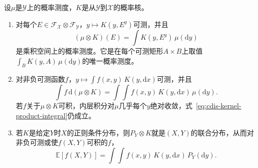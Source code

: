 \begin{theorem}[由核与边缘确定联合规律]
\label{thm:cdis-kernel-product}
设$\mu$是$\mathcal{Y}$上的概率测度，$K$是从$\mathcal{Y}$到$\mathcal{X}$的概率核。
\begin{enumerate}
 \item 对每个$E\in\mathcal{F}_{\mathcal{X}}\otimes\mathcal{F}_{\mathcal{Y}}$，$y\mapsto K(y,E^{y})$可测，并且
 \begin{equation}
  (\mu\otimes K)(E)=\int K(y,E^{y})\,\mu(\mathrm{d}y)
  \label{eq:cdis-kernel-product}
 \end{equation}
 是乘积空间上的概率测度。它是在每个可测矩形$A\times B$上取值$\int_{B}K(y,A)\,\mu(\mathrm{d}y)$的唯一概率测度。
 \item 对非负可测函数$f$，$y\mapsto\int f(x,y)\,K(y,\mathrm{d}x)$可测，并且
 \begin{equation}
  \int f\,\mathrm{d}(\mu\otimes K)=\int\!\!\int f(x,y)\,K(y,\mathrm{d}x)\,\mu(\mathrm{d}y).
  \label{eq:cdis-kernel-product-integral}
 \end{equation}
 若$f$关于$\mu\otimes K$可积，内层积分对$\mu$几乎每个$y$绝对收敛，式~\eqref{eq:cdis-kernel-product-integral}仍成立。
 \item 若$K$是给定$Y$时$X$的正则条件分布，则$P_Y\otimes K$就是$(X,Y)$的联合分布，从而对非负可测或使$f(X,Y)$可积的$f$，
 \begin{equation}
  \mathbb{E}[f(X,Y)]=\int\!\!\int f(x,y)\,K(y,\mathrm{d}x)\,P_Y(\mathrm{d}y).
  \label{eq:cdis-joint-recovery}
 \end{equation}
\end{enumerate}
\end{theorem}

